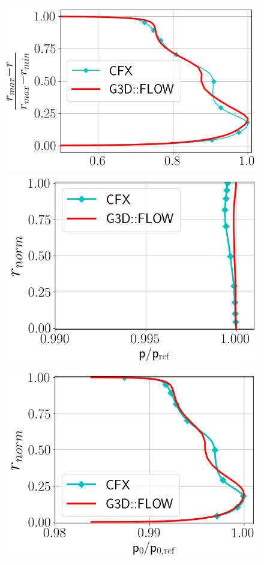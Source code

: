 \begin{figure}[h!]
  \centering
  \begin{minipage}{0.48\columnwidth}
  \includegraphics[width=1.\textwidth]{Figures/MaMave_FRT.png}
  \end{minipage}
  \begin{minipage}{0.48\columnwidth}
  \includegraphics[width=1.\textwidth]{Figures/PAave_FRT.png}
  \end{minipage}
  \begin{minipage}{0.48\columnwidth}
  \includegraphics[width=1.\textwidth]{Figures/P0Mave_FRT.png}

\end{minipage}
\end{figure}
